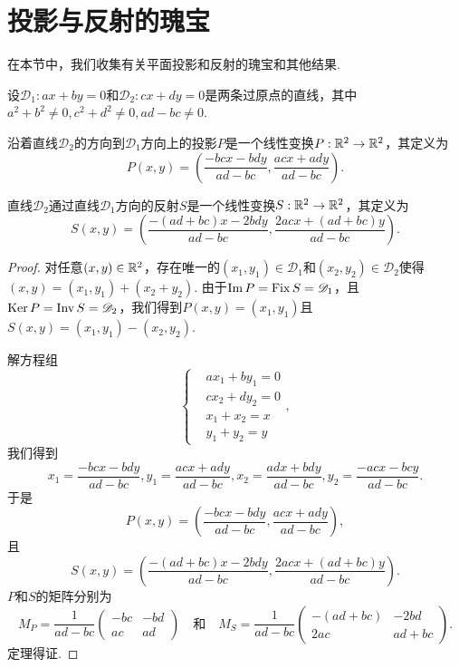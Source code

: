 \section{投影与反射的瑰宝}

在本节中，我们收集有关平面投影和反射的瑰宝和其他结果.

\begin{mybox}
  \begin{theorem}
    设$\mathscr D_1:ax+by=0$和$\mathscr D_2:cx+dy=0$是两条过原点的直线，其中$a^2+b^2\ne0,c^2+d^2\ne0,ad-bc\ne0$.
    \begin{enum}
      \item 沿着直线$\mathscr D_2$的方向到$\mathscr D_1$方向上的投影$P$是一个线性变换$P:\mathbb R^2\to\mathbb R^2$，其定义为
          \[
            P(x,y) = \left( \frac{-bcx - bdy}{ad - bc}, \frac{acx + ady}{ad - bc} \right).
          \]
      \item 直线$\mathscr D_2$通过直线$\mathscr D_1$方向的反射$S$是一个线性变换$S:\mathbb R^2\to\mathbb R^2$，其定义为
          \[
            S(x,y) = \left( \frac{-(ad+bc)x-2bdy}{ad-bc} ,
            \frac{2acx+(ad+bc)y}{ad-bc} \right).
          \]
    \end{enum}
  \end{theorem}
\end{mybox}
\begin{proof}
  对任意$(x,y)\in\mathbb R^2$，存在唯一的$(x_1,y_1)\in\mathscr D_1$和$(x_2,y_2)\in\mathscr D_2$使得$(x,y)=(x_1,y_1)+(x_2+y_2)$. 由于$\operatorname{Im} P=\operatorname{Fix} S=\mathscr D_1$，且$\operatorname{Ker} P=\operatorname{Inv} S=\mathscr D_2$，我们得到$P(x,y)=(x_1,y_1)$且$S(x,y)=(x_1,y_1)-(x_2,y_2)$.

  解方程组
  \[
    \left\{
      \begin{aligned}
        & ax_1 + by_1 = 0 \\
        & cx_2 + dy_2 = 0 \\
        & x_1 + x_2 = x \\
        & y_1 + y_2 = y
      \end{aligned}
    \right.,
  \]
  我们得到
  \[
    x_1 = \frac{-bcx-bdy}{ad-bc}, y_1 = \frac{acx+ady}{ad-bc}, x_2 = \frac{adx+bdy}{ad-bc}, y_2 = \frac{-acx-bcy}{ad-bc}.
  \]
  于是
  \[
    P(x,y) = \left( \frac{-bcx-bdy}{ad-bc},
    \frac{acx+ady}{ad-bc} \right),
  \]
  且
  \[
    S(x,y) = \left( \frac{-(ad+bc)x-2bdy}{ad-bc} ,
    \frac{2acx+(ad+bc)y}{ad-bc} \right).
  \]
  $P$和$S$的矩阵分别为
  \[
    M_P = \frac1{ad-bc} \begin{pmatrix}
      -bc & -bd \\
      ac & ad
    \end{pmatrix} \quad \text{和} \quad
    M_S = \frac1{ad-bc} \begin{pmatrix}
      -(ad + bc) & -2bd \\
      2ac & ad + bc
    \end{pmatrix}.
  \]
  定理得证.
\end{proof}

